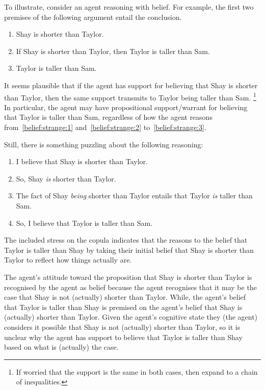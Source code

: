 \documentclass[10pt]{article}
\begin{document}
\begin{note}
  To illustrate, consider an agent reasoning with belief.
  For example, the first two premises of the following argument entail the conclusion.
  \begin{enumerate}
  \item\label{belief:strange:1} Shay is shorter than Taylor.
  \item\label{belief:strange:2} If Shay is shorter than Taylor, then Taylor is taller than Sam.
  \item\label{belief:strange:3} Taylor is taller than Sam.
  \end{enumerate}
  It seems plausible that if the agent has support for believing that Shay is shorter than Taylor, then the same support transmits to Taylor being taller than Sam.\nolinebreak
  \footnote{
    If worried that the support is the same in both cases, then expand to a chain of inequalities.
  }
  In particular, the agent may have propositional support/warrant for believing that Taylor is taller than Sam, regardless of how the agent reasons from~\ref{belief:strange:1} and~\ref{belief:strange:2} to~\ref{belief:strange:3}.

  Still, there is something puzzling about the following reasoning:
  \begin{enumerate}
  \item I believe that Shay is shorter than Taylor.
  \item So, Shay \emph{is} shorter than Taylor.
  \item The fact of Shay \emph{being} shorter than Taylor entails that Taylor \emph{is} taller than Sam.
  \item So, I believe that Taylor is taller than Sam.
  \end{enumerate}
  The included stress on the copula indicates that the reasons to the belief that Taylor is taller than Shay by taking their initial belief that Shay is shorter than Taylor to reflect how things actually are.

  The agent's attitude toward the proposition that Shay is shorter than Taylor is recognised by the agent as belief because the agent recognises that it may be the case that Shay is not (actually) shorter than Taylor.
  While, the agent's belief that Taylor is taller than Shay is premised on the agent's belief that Shay is (actually) shorter than Taylor.
  Given the agent's cognitive state they (the agent) considers it possible that Shay is not (actually) shorter than Taylor, so it is unclear why the agent has support to believe that Taylor is taller than Shay based on what is (actually) the case.


\end{note}
\end{document}
